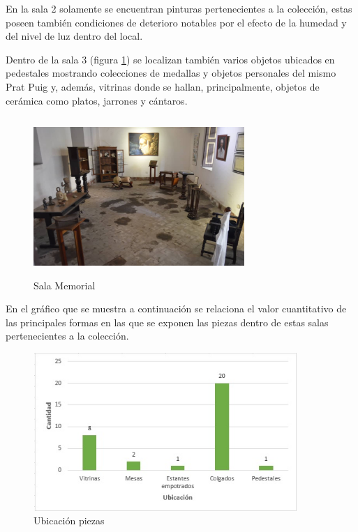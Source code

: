     \newpage

    En la sala 2 solamente se encuentran pinturas pertenecientes a la colección, estas poseen también condiciones de deterioro notables por el efecto de la humedad y del nivel de luz dentro del local.

    Dentro de la sala 3 (figura \ref{imag:sala_3}) se localizan también varios objetos ubicados en pedestales mostrando colecciones de medallas y objetos personales del mismo Prat Puig y, además, vitrinas donde se hallan, principalmente, objetos de cerámica como platos, jarrones y cántaros.\newline
    
    \begin{figure}[H]
        \centering
        \includegraphics[width=8cm, height=6cm]{imagenes/sala_3.jpeg}
        \caption{Sala Memorial}
        \label{imag:sala_3}
    \end{figure}

    En el gráfico que se muestra a continuación se relaciona el valor cuantitativo de las principales formas en las que se exponen las piezas dentro de estas salas pertenecientes a la colección.

    \begin{figure}[H]
        \centering
        \includegraphics[width=10cm, height=6cm]{imagenes/formas expositivas.jpg}
        \caption{Ubicación piezas}
        \label{imag:ubicacion_piezas}
    \end{figure}

